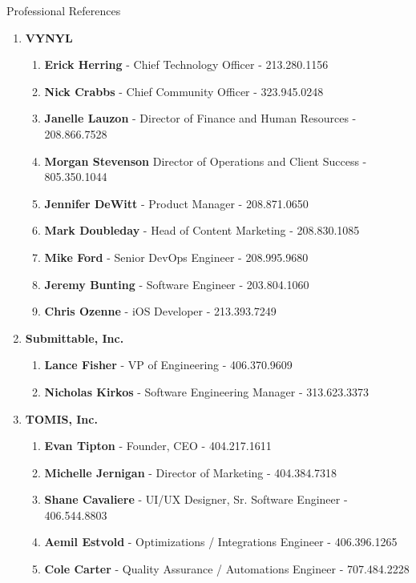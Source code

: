 \documentclass[oneside]{article}%
\begin{document}
\newpage
\noindent
\huge{Professional References}\\
\small
\begin{enumerate}[]
	\item \large \textbf{VYNYL} \small
		\begin{enumerate}[]
			\item \textbf{Erick Herring} - Chief Technology Officer - 213.280.1156
			\item \textbf{Nick Crabbs} - Chief Community Officer - 323.945.0248
			\item \textbf{Janelle Lauzon} - Director of Finance and Human Resources - 208.866.7528
			\item \textbf{Morgan Stevenson} Director of Operations and Client Success - 805.350.1044
			\item \textbf{Jennifer DeWitt} - Product Manager - 208.871.0650
			\item \textbf{Mark Doubleday} - Head of Content Marketing - 208.830.1085
			\item \textbf{Mike Ford} - Senior DevOps Engineer - 208.995.9680
			\item \textbf{Jeremy Bunting} - Software Engineer - 203.804.1060
			\item \textbf{Chris Ozenne} - iOS Developer - 213.393.7249
		\end{enumerate}
	\item \large \textbf{Submittable, Inc.} \small
		\begin{enumerate}[]
			\item \textbf{Lance Fisher} - VP of Engineering - 406.370.9609
			\item \textbf{Nicholas Kirkos} - Software Engineering Manager - 313.623.3373
		\end{enumerate}
	\item \large \textbf{TOMIS, Inc.} \small
		\begin{enumerate}[]
			\item \textbf{Evan Tipton} - Founder, CEO - 404.217.1611
			\item \textbf{Michelle Jernigan} - Director of Marketing - 404.384.7318
			\item \textbf{Shane Cavaliere} - UI/UX Designer, Sr. Software Engineer - 406.544.8803
			\item \textbf{Aemil Estvold} - Optimizations / Integrations Engineer - 406.396.1265
			\item \textbf{Cole Carter} - Quality Assurance / Automations Engineer - 707.484.2228
		\end{enumerate}

\end{enumerate}
\end{document}
